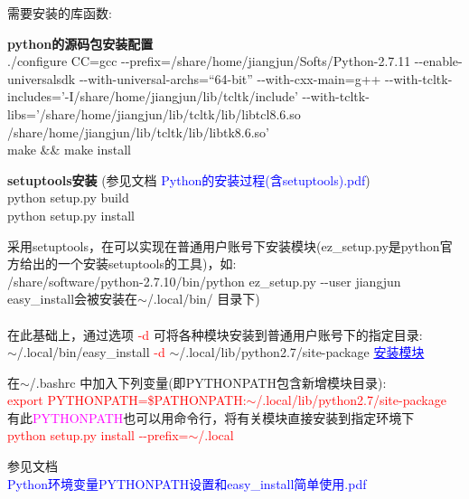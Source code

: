 \documentclass[10pt,a4paper]{article}
\begin{document}
需要安装的库函数:

\textbf{python的源码包安装配置}\\
./configure CC=gcc -\/-prefix=/share/home/jiangjun/Softs/Python-2.7.11  -\/-enable-universalsdk -\/-with-universal-archs=``64-bit''  -\/-with-cxx-main=g++ -\/-with-tcltk-includes='-I/share/home/jiangjun/lib/tcltk/include' -\/-with-tcltk-libs='/share/home/jiangjun/lib/tcltk/lib/libtcl8.6.so /share/home/jiangjun/lib/tcltk/lib/libtk8.6.so'\\
make \&\& make install

\textbf{setuptools安装} (参见文档 \textcolor{blue}{\textrm{Python}的安装过程(含\textrm{setuptools}).pdf})\\
python setup.py build\\
python setup.py install


采用\textrm{setuptools}，在可以实现在普通用户账号下安装模块(\textrm{ez\_setup.py}是\textrm{python}官方给出的一个安装\textrm{setuptools}的工具)，如:\\
/share/software/python-2.7.10/bin/python ez\_setup.py -\/-user jiangjun\\
\textrm{easy\_install}会被安装在$\sim$/.local/bin/ 目录下)\\\\

在此基础上，通过选项 \textcolor{red}{-d} 可将各种模块安装到普通用户账号下的指定目录:\\
$\sim$/.local/bin/easy\_install \textcolor{red}{-d} $\sim$/.local/lib/python2.7/site-package \textcolor{blue}{\underline{安装模块}}

在$\sim$/.bashrc 中加入下列变量(即\textrm{PYTHONPATH}包含新增模块目录):\\
\textcolor{red}{export PYTHONPATH=\$PATHONPATH:$\sim$/.local/lib/python2.7/site-package}\\

有此\textcolor{magenta}{PYTHONPATH}也可以用命令行，将有关模块直接安装到指定环境下\\
\textcolor{red}{python setup.py install -\/-prefix=$\sim$/.local}

参见文档\\
\textcolor{blue}{\textrm{Python}环境变量\textrm{PYTHONPATH}设置和\textrm{easy\_install}简单使用.pdf}
\end{document}
